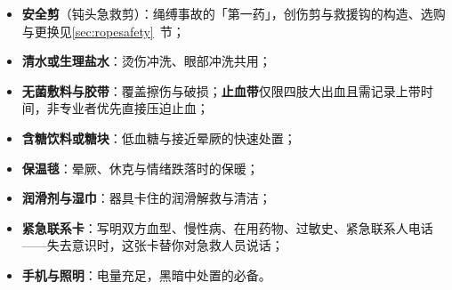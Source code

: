 \documentclass[12pt,UTF8]{ctexbook}
\begin{document}
\begin{itemize}
\item \textbf{安全剪}（钝头急救剪）：绳缚事故的「第一药」，创伤剪与救援钩的构造、选购与更换见\ref{sec:ropesafety}~节；
\item \textbf{清水或生理盐水}：烫伤冲洗、眼部冲洗共用；
\item \textbf{无菌敷料与胶带}：覆盖擦伤与破损；\textbf{止血带}仅限四肢大出血且需记录上带时间，非专业者优先直接压迫止血；
\item \textbf{含糖饮料或糖块}：低血糖与接近晕厥的快速处置；
\item \textbf{保温毯}：晕厥、休克与情绪跌落时的保暖；
\item \textbf{润滑剂与湿巾}：器具卡住的润滑解救与清洁；
\item \textbf{紧急联系卡}：写明双方血型、慢性病、在用药物、过敏史、紧急联系人电话——失去意识时，这张卡替你对急救人员说话；
\item \textbf{手机与照明}：电量充足，黑暗中处置的必备。
\end{itemize}
\end{document}
